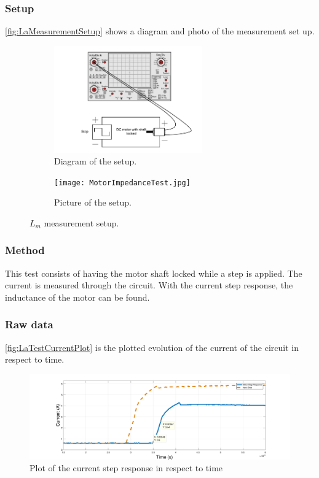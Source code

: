 \subsubsection*{Setup}
\autoref{fig:LaMeasurementSetup} shows a diagram and photo of the measurement set up.
\begin{figure}[htbp]
	\centering
	\begin{subfigure}{0.50\textwidth}
		\includegraphics[width=0.7\textwidth]{figures/appendix/Motor&GearTests/LmDiagram}
		\caption{Diagram of the setup.} \label{fig:LaMeasurementDiagram}
	\end{subfigure}
	\begin{subfigure}{0.40\textwidth}
		\texttt{[image: MotorImpedanceTest.jpg]}
		\caption{Picture of the setup.} \label{fig:LaMeasurementPictures}
	\end{subfigure}
	\caption{$L_m$ measurement setup.} \label{fig:LaMeasurementSetup}   
\end{figure}

\subsubsection*{Method}
This test consists of having the motor shaft locked while a step is applied. The current is measured through the circuit. With the current step response, the inductance of the motor can be found. 
\subsubsection*{Raw data}
\autoref{fig:LaTestCurrentPlot} is the plotted evolution of the current of the circuit in respect to time.

\begin{figure}[htbp]
	\centering
	\includegraphics[width=1.2\textwidth]{figures/appendix/Motor&GearTests/PlotLm}
	\caption{Plot of the current step response in respect to time}\label{fig:LaTestCurrentPlot}
\end{figure}


